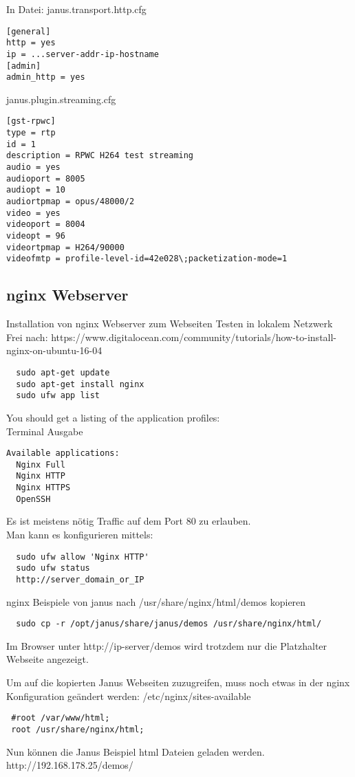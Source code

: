 In Datei: janus.transport.http.cfg
\begin{verbatim}
[general]
http = yes
ip = ...server-addr-ip-hostname
[admin]
admin_http = yes
\end{verbatim}

janus.plugin.streaming.cfg
\begin{verbatim}
[gst-rpwc]
type = rtp 
id = 1 
description = RPWC H264 test streaming 
audio = yes 
audioport = 8005 
audiopt = 10 
audiortpmap = opus/48000/2 
video = yes 
videoport = 8004 
videopt = 96 
videortpmap = H264/90000 
videofmtp = profile-level-id=42e028\;packetization-mode=1 
\end{verbatim}

\subsection{nginx Webserver} \label{Refnginx}
Installation von nginx Webserver zum Webseiten Testen in lokalem Netzwerk\\
Frei nach: https://www.digitalocean.com/community/tutorials/how-to-install-nginx-on-ubuntu-16-04
\begin{verbatim}
  sudo apt-get update
  sudo apt-get install nginx
  sudo ufw app list
\end{verbatim}

You should get a listing of the application profiles:\\
Terminal Ausgabe
\begin{verbatim}
Available applications:
  Nginx Full
  Nginx HTTP
  Nginx HTTPS
  OpenSSH
\end{verbatim}

Es ist meistens nötig Traffic auf dem Port 80 zu erlauben.\\
Man kann es konfigurieren mittels:
\begin{verbatim}
  sudo ufw allow 'Nginx HTTP'
  sudo ufw status
  http://server_domain_or_IP
\end{verbatim}

nginx Beispiele von janus nach /usr/share/nginx/html/demos kopieren
\begin{verbatim}
  sudo cp -r /opt/janus/share/janus/demos /usr/share/nginx/html/
\end{verbatim}
Im Browser unter http://ip-server/demos
wird trotzdem nur die Platzhalter Webseite angezeigt.

Um auf die kopierten Janus Webseiten zuzugreifen, muss noch etwas in der nginx Konfiguration geändert werden: /etc/nginx/sites-available
\begin{verbatim}
 #root /var/www/html;
 root /usr/share/nginx/html;
\end{verbatim}
Nun können die  Janus Beispiel html Dateien geladen werden.\\
http://192.168.178.25/demos/\\

